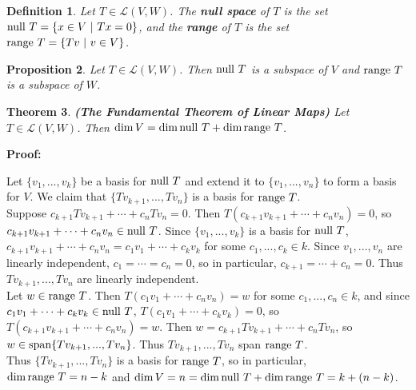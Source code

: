 \documentclass{article}
\theoremstyle{colontheorem}
\newtheorem{theorem}{Theorem}[section]
\newtheorem{proposition}[theorem]{Proposition}
\newtheorem{definition}[theorem]{Definition}
\newcommand{\Span}{\textnormal{span}}
\newcommand{\Null}{\textnormal{null }}
\newcommand{\Range}{\textnormal{range }}
\newenvironment{Theorem}
{
	\begin{mdframed}[backgroundcolor=TheoremOrange!10]
	\begin{theorem}
}
{
	\end{theorem}
	\end{mdframed}
	
	\vspace{.15in}
}
\newenvironment{Proposition}
{
	\begin{mdframed}[backgroundcolor=TheoremOrange!10]
	\begin{proposition}
}
{
	\end{proposition}
	\end{mdframed}
	
	\vspace{.15in}
}
\newenvironment{Def}
{
	\begin{mdframed}[backgroundcolor=DefGreen!10]
	\begin{definition}
}
{
	\end{definition}
	\end{mdframed}
	
	\vspace{.15in}
}
\newenvironment{Proof}
{
	\vspace{-.3in}
	
	\begin{mdframed}[backgroundcolor=ProofPurple!10]
	\textbf{Proof:}%
}
{
	\end{mdframed}
	
	\vspace{.15in}
}
\begin{document}
\begin{Def}
	
	Let $T \in \mathcal{L}(V,W)$. The \textbf{null space} of $T$ is the set $\Null T = \{x \in V\ |\ Tx = 0\}$, and the \textbf{range} of $T$ is the set $\Range T = \{Tv\ |\ v \in V\}$.
	
\end{Def}



\begin{Proposition}
	
	Let $T \in \mathcal{L}(V,W)$. Then $\Null T$ is a subspace of $V$ and $\Range T$ is a subspace of $W$.
	
\end{Proposition}




\begin{Theorem}
	
	\textbf{(The Fundamental Theorem of Linear Maps)} Let $T \in \mathcal{L}(V,W)$. Then $\dim V = \dim \Null T + \dim \Range T$.
	
\end{Theorem}



\begin{Proof}
	Let $\{v_1, ..., v_k\}$ be a basis for $\Null T$ and extend it to $\{v_1, ..., v_n\}$ to form a basis for $V$. We claim that $\{Tv_{k+1}, ..., Tv_n\}$ is a basis for $\Range T$.\\
	
	Suppose $c_{k+1} Tv_{k+1} + \cdots + c_n Tv_n = 0$. Then $T(c_{k+1} v_{k+1} + \cdots + c_n v_n) = 0$, so $c_{k+1} v_{k+1} + \cdots + c_n v_n \in \Null T$. Since $\{v_1, ..., v_k\}$ is a basis for $\Null T$, $c_{k+1} v_{k+1} + \cdots + c_n v_n = c_1 v_1 + \cdots + c_k v_k$ for some $c_1, ..., c_k \in k$. Since $v_1, ..., v_n$ are linearly independent, $c_1 = \cdots = c_n = 0$, so in particular, $c_{k+1} = \cdots + c_n = 0$. Thus $Tv_{k+1}, ..., Tv_n$ are linearly independent.\\
	
	Let $w \in \Range T$. Then $T(c_1 v_1 + \cdots + c_n v_n) = w$ for some $c_1, ..., c_n \in k$, and since $c_1 v_1 + \cdots + c_k v_k \in \Null T$, $T(c_1 v_1 + \cdots + c_k v_k) = 0$, so $T(c_{k+1} v_{k+1} + \cdots + c_n v_n) = w$. Then $w = c_{k+1} Tv_{k+1} + \cdots + c_n Tv_n$, so $w \in \Span \{Tv_{k+1}, ..., Tv_n\}$. Thus $Tv_{k+1}, ..., Tv_n$ span $\Range T$.\\
	
	Thus $\{Tv_{k+1}, ..., Tv_n\}$ is a basis for $\Range T$, so in particular, $\dim \Range T = n - k$ and $\dim V = n = \dim \Null T + \dim \Range T = k + (n-k)$.
	
\end{Proof}
\end{document}
